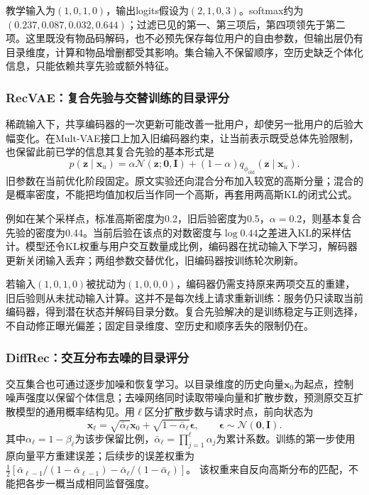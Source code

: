 教学输入为$(1,0,1,0)$，输出logits假设为$(2,1,0,3)$。softmax约为$(0.237,0.087,0.032,0.644)$；过滤已见的第一、第三项后，第四项领先于第二项。这里既没有物品码解码，也不必预先保存每位用户的自由参数，但输出层仍有目录维度，计算和物品增删都受其影响。集合输入不保留顺序，空历史缺乏个体化信息，只能依赖共享先验或额外特征。

\subsubsection{RecVAE：复合先验与交替训练的目录评分}
\label{sec:rs-recvae}

稀疏输入下，共享编码器的一次更新可能改善一批用户，却使另一批用户的后验大幅变化。在Mult-VAE接口上加入旧编码器约束，让当前表示既受总体先验限制，也保留此前已学的信息其复合先验的基本形式是
\begin{equation}
 p(\bm z\mid\bm x_u)=
 \alpha\mathcal N(\bm z;\bm0,\bm I)
 +(1-\alpha)q_{\phi_{\mathrm{old}}}(\bm z\mid\bm x_u).
 \label{eq:rs-recvae-prior}
\end{equation}
旧参数在当前优化阶段固定。原文实验还向混合分布加入较宽的高斯分量；混合的是概率密度，不能把均值加权后当作同一个高斯，再套用两高斯KL的闭式公式。

例如在某个采样点，标准高斯密度为0.2，旧后验密度为0.5，$\alpha=0.2$，则基本复合先验的密度为0.44。当前后验在该点的对数密度与$\log0.44$之差进入KL的采样估计。模型还令KL权重与用户交互数量成比例，编码器在扰动输入下学习，解码器更新关闭输入丢弃；两组参数交替优化，旧编码器按训练轮次刷新。

若输入$(1,0,1,0)$被扰动为$(1,0,0,0)$，编码器仍需支持原来两项交互的重建，旧后验则从未扰动输入计算。这并不是每次线上请求重新训练：服务仍只读取当前编码器，得到潜在状态并解码目录分数。复合先验解决的是训练稳定与正则选择，不自动修正曝光偏差；固定目录维度、空历史和顺序丢失的限制仍在。

\subsubsection{DiffRec：交互分布去噪的目录评分}
\label{sec:rs-diffrec}

交互集合也可通过逐步加噪和恢复学习。以目录维度的历史向量$\bm x_0$为起点，控制噪声强度以保留个体信息；去噪网络同时读取带噪向量和扩散步数，预测原交互扩散模型的通用概率结构见。用$\ell$区分扩散步数与请求时点，前向状态为
\begin{equation}
 \bm x_\ell=\sqrt{\bar\alpha_\ell}\bm x_0+
       \sqrt{1-\bar\alpha_\ell}\bm\epsilon,\qquad
 \bm\epsilon\sim\mathcal N(\bm0,\bm I).
 \label{eq:rs-diffrec-noise}
\end{equation}
其中$\alpha_\ell=1-\beta_\ell$为该步保留比例，$\bar\alpha_\ell=\prod_{j=1}^\ell\alpha_j$为累计系数。训练的第一步使用原向量平方重建误差；后续步的误差权重为
$\tfrac12[\bar\alpha_{\ell-1}/(1-\bar\alpha_{\ell-1})-\bar\alpha_\ell/(1-\bar\alpha_\ell)]$。
该权重来自反向高斯分布的匹配，不能把各步一概当成相同监督强度。

